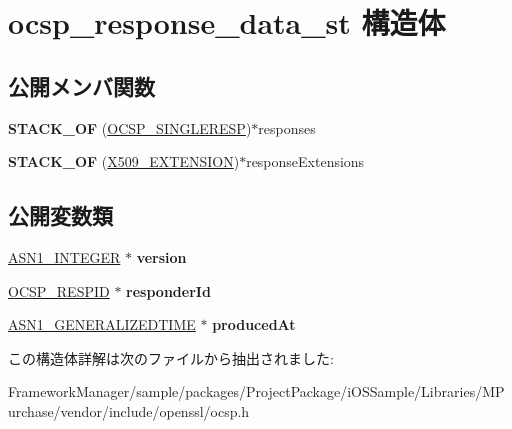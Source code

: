 \hypertarget{structocsp__response__data__st}{}\section{ocsp\+\_\+response\+\_\+data\+\_\+st 構造体}
\label{structocsp__response__data__st}
\subsection*{公開メンバ関数}
\begin{DoxyCompactItemize}
\item 
\hypertarget{structocsp__response__data__st_a3c784868ab35de9ca683fcfccd4432ce}{}{\bfseries S\+T\+A\+C\+K\+\_\+\+O\+F} (\hyperlink{structocsp__single__response__st}{O\+C\+S\+P\+\_\+\+S\+I\+N\+G\+L\+E\+R\+E\+S\+P})$\ast$responses\label{structocsp__response__data__st_a3c784868ab35de9ca683fcfccd4432ce}

\item 
\hypertarget{structocsp__response__data__st_af4616df2b23f48495d29f945980b4fe0}{}{\bfseries S\+T\+A\+C\+K\+\_\+\+O\+F} (\hyperlink{struct_x509__extension__st}{X509\+\_\+\+E\+X\+T\+E\+N\+S\+I\+O\+N})$\ast$response\+Extensions\label{structocsp__response__data__st_af4616df2b23f48495d29f945980b4fe0}

\end{DoxyCompactItemize}
\subsection*{公開変数類}
\begin{DoxyCompactItemize}
\item 
\hypertarget{structocsp__response__data__st_ab8d2433650a7535a807f54c97aa03e94}{}\hyperlink{structasn1__string__st}{A\+S\+N1\+\_\+\+I\+N\+T\+E\+G\+E\+R} $\ast$ {\bfseries version}\label{structocsp__response__data__st_ab8d2433650a7535a807f54c97aa03e94}

\item 
\hypertarget{structocsp__response__data__st_ad3f3152513fd758f44cec6d8b1d78375}{}\hyperlink{structocsp__responder__id__st}{O\+C\+S\+P\+\_\+\+R\+E\+S\+P\+I\+D} $\ast$ {\bfseries responder\+Id}\label{structocsp__response__data__st_ad3f3152513fd758f44cec6d8b1d78375}

\item 
\hypertarget{structocsp__response__data__st_a70d47981b37a14ee1dabb1b8dd170e0d}{}\hyperlink{structasn1__string__st}{A\+S\+N1\+\_\+\+G\+E\+N\+E\+R\+A\+L\+I\+Z\+E\+D\+T\+I\+M\+E} $\ast$ {\bfseries produced\+At}\label{structocsp__response__data__st_a70d47981b37a14ee1dabb1b8dd170e0d}

\end{DoxyCompactItemize}


この構造体詳解は次のファイルから抽出されました\+:\begin{DoxyCompactItemize}
\item 
Framework\+Manager/sample/packages/\+Project\+Package/i\+O\+S\+Sample/\+Libraries/\+M\+Purchase/vendor/include/openssl/ocsp.\+h\end{DoxyCompactItemize}
